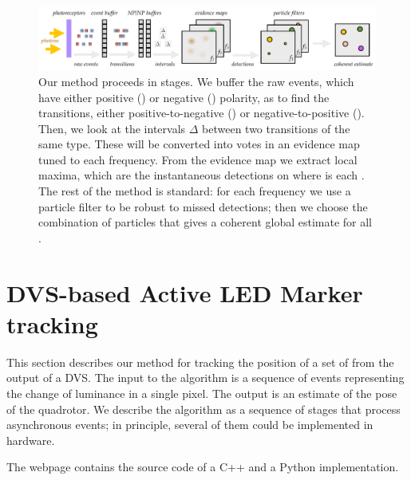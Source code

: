 \begin{figure}
\centering{}\includegraphics[width=16cm]{figures/slides/overall1}\caption{Our method proceeds in stages. We buffer the raw events, which have
either positive (\pP) or negative (\pN) polarity, as to find the
transitions, either positive-to-negative (\pPN) or negative-to-positive
(\pNP). Then, we look at the intervals $\Delta$ between two transitions
of the same type. These will be converted into votes in an evidence
map tuned to each frequency. From the evidence map we extract local
maxima, which are the instantaneous detections on where is each \ALM.
The rest of the method is standard: for each frequency we use a particle
filter to be robust to missed detections; then we choose the combination
of particles that gives a coherent global estimate for all \ALMs.}
\end{figure}



\section{DVS-based Active LED Marker tracking }

This section describes our method for tracking the position of a set
of \ALMs from the output of a DVS. The input to the algorithm is
a sequence of events representing the change of luminance in a single
pixel. The output is an estimate of the pose of the quadrotor. We
describe the algorithm as a sequence of stages that process asynchronous
events; in principle, several of them could be implemented in hardware.

The webpage \xxx contains the source code of a C++ and a Python implementation.

